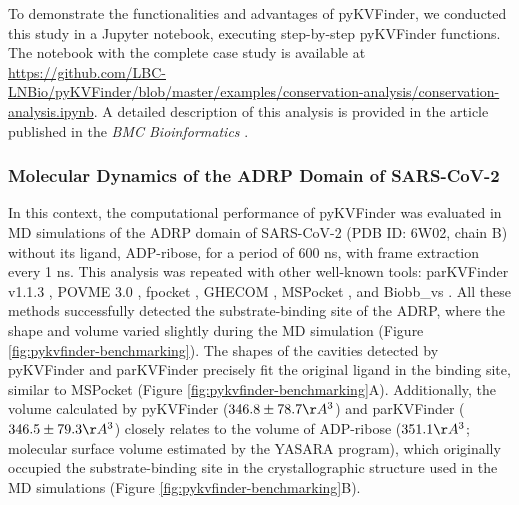 \documentclass[Ingles]{phdthesis}
\begin{document}
To demonstrate the functionalities and advantages of pyKVFinder, we conducted this study in a Jupyter notebook, executing step-by-step pyKVFinder functions. The notebook with the complete case study is available at \url{https://github.com/LBC-LNBio/pyKVFinder/blob/master/examples/conservation-analysis/conservation-analysis.ipynb}. A detailed description of this analysis is provided in the article published in the \textit{BMC Bioinformatics} \cite{guerra2021}.

\subsubsection{Molecular Dynamics of the ADRP Domain of SARS-CoV-2}

In this context, the computational performance of pyKVFinder was evaluated in \acs{MD} simulations of the ADRP domain of SARS-CoV-2 (PDB ID: 6W02, chain B) without its ligand, ADP-ribose, for a period of 600 ns, with frame extraction every 1 ns. This analysis was repeated with other well-known tools: parKVFinder v1.1.3 \cite{guerra2020}, POVME 3.0 \cite{povme}, fpocket \cite{fpocket}, GHECOM \cite{ghecom}, MSPocket \cite{mspocket}, and Biobb\_vs \cite{biobbvs}. All these methods successfully detected the substrate-binding site of the ADRP, where the shape and volume varied slightly during the MD simulation (Figure \ref{fig:pykvfinder-benchmarking}). The shapes of the cavities detected by pyKVFinder and parKVFinder precisely fit the original ligand in the binding site, similar to MSPocket (Figure \ref{fig:pykvfinder-benchmarking}A). Additionally, the volume calculated by pyKVFinder ($346.8 \pm 78.7 \AA^3$) and parKVFinder ($346.5 \pm 79.3 \AA^3$) closely relates to the volume of ADP-ribose ($351.1 \AA^3$; molecular surface volume estimated by the YASARA program), which originally occupied the substrate-binding site in the crystallographic structure used in the MD simulations (Figure \ref{fig:pykvfinder-benchmarking}B).
\end{document}
